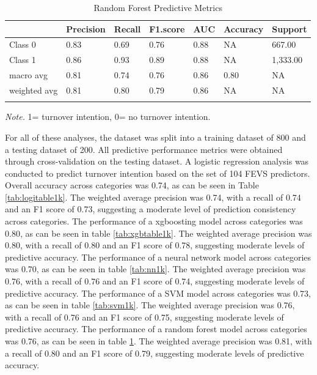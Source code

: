 \documentclass[
  man]{apa7}
\begin{document}
\begin{table}[tbp]

\begin{center}
\begin{threeparttable}

\caption{\label{tab:rf1k}Random Forest Predictive Metrics}

\begin{tabular}{lllllll}
\toprule
 & \multicolumn{1}{c}{Precision} & \multicolumn{1}{c}{Recall} & \multicolumn{1}{c}{F1.score} & \multicolumn{1}{c}{AUC} & \multicolumn{1}{c}{Accuracy} & \multicolumn{1}{c}{Support}\\
\midrule
Class 0 & 0.83 & 0.69 & 0.76 & 0.88 & NA & 667.00\\
Class 1 & 0.86 & 0.93 & 0.89 & 0.88 & NA & 1,333.00\\
macro avg & 0.81 & 0.74 & 0.76 & 0.86 & 0.80 & NA\\
weighted avg & 0.81 & 0.80 & 0.79 & 0.86 & NA & NA\\
\bottomrule
\addlinespace
\end{tabular}

\begin{tablenotes}[para]
\normalsize{\textit{Note.} 1= turnover intention, 0= no turnover intention.}
\end{tablenotes}

\end{threeparttable}
\end{center}

\end{table}

For all of these analyses, the dataset was split into a training dataset of 800 and a testing dataset of 200. All predictive performance metrics were obtained through cross-validation on the testing dataset. A logistic regression analysis was conducted to predict turnover intention based on the set of 104 FEVS predictors. Overall accuracy across categories was 0.74, as can be seen in Table \ref{tab:logitable1k}. The weighted average precision was 0.74, with a recall of 0.74 and an F1 score of 0.73, suggesting a moderate level of prediction consistency across categories.
The performance of a xgboosting model across categories was 0.80, as can be seen in table \ref{tab:xgbtable1k}. The weighted average precision was 0.80, with a recall of 0.80 and an F1 score of 0.78, suggesting moderate levels of predictive accuracy.
The performance of a neural network model across categories was 0.70, as can be seen in table \ref{tab:nn1k}. The weighted average precision was 0.76, with a recall of 0.76 and an F1 score of 0.74, suggesting moderate levels of predictive accuracy.
The performance of a SVM model across categories was 0.73, as can be seen in table \ref{tab:svm1k}. The weighted average precision was 0.76, with a recall of 0.76 and an F1 score of 0.75, suggesting moderate levels of predictive accuracy.
The performance of a random forest model across categories was 0.76, as can be seen in table \ref{tab:rf1k}. The weighted average precision was 0.81, with a recall of 0.80 and an F1 score of 0.79, suggesting moderate levels of predictive accuracy.
\end{document}
